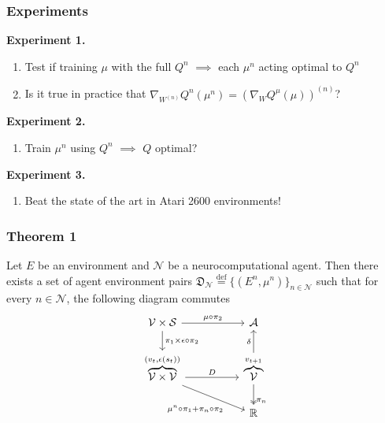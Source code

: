 \documentclass{beamer}
\numberwithin{equation}{subsection}
\numberwithin{theorem}{subsection}
\def\reals{{\mathbb R}}
\def\defeq{\stackrel{\text{def}}{=}}
\def\scriptv{{\mathcal V}}
\def\scripta{{\mathcal A}}
\def\scriptn{{\mathcal N}}
\def\scripts{{\mathcal S}}
\begin{document}
\begin{frame}
  \frametitle{Experiments}
  \textbf{Experiment 1.}
  \begin{enumerate}
    \item Test if training $\mu$ with the full $Q^n$ $\implies$ each $\mu^n$ acting optimal to $Q^n$
    \item Is it true in practice that $\nabla_{W^{(n)}} Q^{n}(\mu^n) = \left(\nabla_{W} Q^\mu(\mu)\right)^{(n)}$?
  \end{enumerate}
    \textbf{Experiment 2.}
    \begin{enumerate}
      \item Train $\mu^n$ using $Q^n$ $\implies$ $Q$ optimal?
    \end{enumerate}
        \textbf{Experiment 3.}
    \begin{enumerate}
      \item Beat the state of the art in Atari 2600 environments!
    \end{enumerate}
\end{frame}
\begin{frame}[fragile]
    \frametitle{Theorem 1}
    \begin{theorem}\label{thm:ncomp}
      Let $E$ be an environment and $\scriptn$ be a neurocomputational agent. Then there exists a set of agent environment pairs $\mathfrak{D}_\scriptn \defeq \{(E^n, \mu^n)\}_{n\in \scriptn}$ such that for every $n \in \scriptn$, the following diagram commutes
        \begin{equation}\label{eq:sub_env_com}
            \begin{tikzcd} %
          \scriptv  \times \scripts \arrow{r}{\mu\circ\pi_2}
               \arrow{d}
                 {\pi_1  \times\epsilon \circ \pi_2}  &[+25pt]  \scripta    \\
            \overbrace{\scriptv \times \scriptv}^{(v_{t},\epsilon(s_t))}
                        \arrow{r}{D}
                                    \arrow[pos = 0.7]{rd}[swap]{\mu^n\circ\pi_1 + \pi_n \circ \pi_2}
                        & \overbrace{\scriptv}^{v_{t+1}}
                                              \arrow[two heads, pos=0.8]
                                                {d}
                                                {\pi_n}
                                              \arrow{u}{\delta} \\
    &\reals
           \end{tikzcd}
        \end{equation}
    \end{theorem}
\end{frame}
\end{document}
